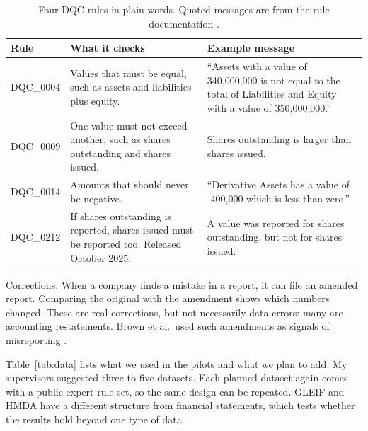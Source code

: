 \documentclass[11pt,a4paper]{article}
\begin{document}
\begin{table}[htbp]
\centering
\small
\begin{tabularx}{\textwidth}{@{}p{1.8cm}LL@{}}
\toprule
Rule & What it checks & Example message \\
\midrule
DQC\_0004 & Values that must be equal, such as assets and liabilities plus equity. & ``Assets with a value of 340,000,000 is not equal to the total of Liabilities and Equity with a value of 350,000,000.'' \\
DQC\_0009 & One value must not exceed another, such as shares outstanding and shares issued. & Shares outstanding is larger than shares issued. \\
DQC\_0014 & Amounts that should never be negative. & ``Derivative Assets has a value of -400,000 which is less than zero.'' \\
DQC\_0212 & If shares outstanding is reported, shares issued must be reported too. Released October 2025. & A value was reported for shares outstanding, but not for shares issued. \\
\bottomrule
\end{tabularx}
\caption{Four DQC rules in plain words. Quoted messages are from the rule documentation \cite{dqc}.}
\label{tab:dqc}
\end{table}

Corrections. When a company finds a mistake in a report, it can file an amended report. Comparing the original with the amendment shows which numbers changed. These are real corrections, but not necessarily data errors: many are accounting restatements. Brown et al.\ used such amendments as signals of misreporting \cite{brown}.

Table~\ref{tab:data} lists what we used in the pilots and what we plan to add. My supervisors suggested three to five datasets. Each planned dataset again comes with a public expert rule set, so the same design can be repeated. GLEIF and HMDA have a different structure from financial statements, which tests whether the results hold beyond one type of data.
\end{document}
